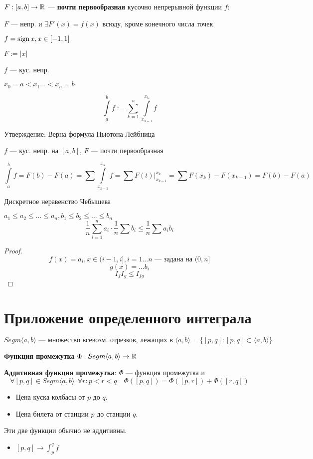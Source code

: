 \begin{definition}
    $F:[a,b]\to\mathbb{R}$ --- \textbf{почти первообразная} кусочно непрерывной функции $f$:
    
    $F$ --- непр. и $\exists F'(x) = f(x)$ всюду, кроме конечного числа точек
    \begin{example}
        $f=\operatorname{\text{sign}} x, x\in[-1,1]$

        $F:=|x|$
    \end{example}
\end{definition}

$f$ --- кус. непр.

$x_0=a<x_1\ldots<x_n=b$

$$\int\limits_a^b f := \sum\limits_{k=1}^n \int\limits_{x_{k-1}}^{x_k} f$$

Утверждение: Верна формула Ньютона-Лейбница

$f$ --- кус. непр. на $[a,b]$, $F$ --- почти первообразная

$$\int\limits_{a}^{b} f = F(b)-F(a)=\sum\int\limits_{x_{k-1}}^{x_k} f = \sum F(t)|_{x_{k-1}}^{x_k}=\sum F(x_k)-F(x_{k-1})=F(b)-F(a)$$

\begin{example}
    Дискретное неравенство Чебышева

    $a_1\leq a_2\leq \ldots \leq a_n, b_1\leq b_2\leq\ldots\leq b_n$
    $$\frac{1}{n}\sum\limits_{i=1}^n a_i\cdot \frac{1}{n}\sum b_i\leq \frac{1}{n}\sum a_ib_i$$
\end{example}
\begin{proof}
    $$f(x)=a_i, x\in(i-1, i], i=1\ldots n \text{ --- задана на } (0,n]$$
    $$g(x) = \ldots b_i$$
    $$I_fI_g\leq I_{fg}$$
\end{proof}

\section{Приложение определенного интеграла}

$$Segm\langle a,b\rangle \text{ --- множество всевозм. отрезков, лежащих в } \langle a,b\rangle = \{[p, q] : [p,q]\subset\langle a,b\rangle\}$$
\begin{definition}
    \textbf{Функция промежутка} $\Phi : Segm\langle a,b\rangle \to \mathbb{R}$
\end{definition}
\begin{definition}
    \textbf{Аддитивная функция промежутка}: $\Phi$ --- функция промежутка и
    $$\forall [p,q]\in Segm\langle a,b\rangle \ \ \forall r : p < r < q \quad \Phi([p,q])=\Phi([p,r])+\Phi([r,q])$$
\end{definition}
\begin{example}
    \begin{itemize}
        \item Цена куска колбасы от $p$ до $q$.
        \item Цена билета от станции $p$ до станции $q$.
    \end{itemize}
    Эти две функции обычно не аддитивны.
    \begin{itemize}
        \item $[p,q]\to\int_p^q f$
    \end{itemize}
\end{example}

